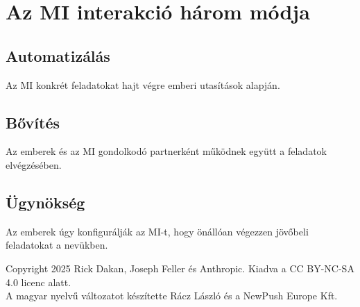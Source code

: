 \documentclass[a4paper, 11pt]{article}
\begin{document}
\section{Az MI interakció három módja}

\subsection{Automatizálás}
Az MI konkrét feladatokat hajt végre emberi utasítások alapján.

\subsection{Bővítés}
Az emberek és az MI gondolkodó partnerként működnek együtt a feladatok elvégzésében.

\subsection{Ügynökség}
Az emberek úgy konfigurálják az MI-t, hogy önállóan végezzen jövőbeli feladatokat a nevükben.

\vfill
\begin{center}
\small
Copyright 2025 Rick Dakan, Joseph Feller és Anthropic. Kiadva a CC BY-NC-SA 4.0 licenc alatt.\\A magyar nyelvű változatot készítette Rácz László és a NewPush Europe Kft.
\end{center}
\end{document}
